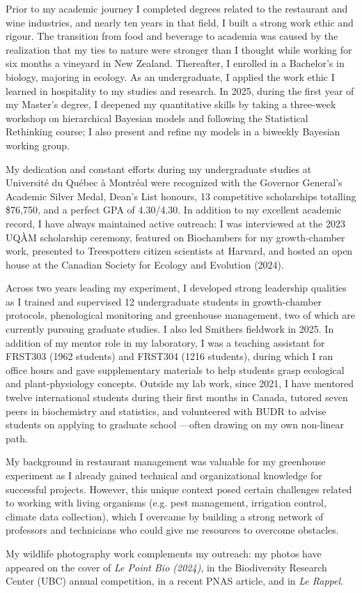 \documentclass[12pt]{article}
\begin{document}
Prior to my academic journey I completed degrees related to the restaurant and wine industries, and nearly ten years in that field, I built a strong work ethic and rigour. The transition from food and beverage to academia was caused by the realization that my ties to nature were stronger than I thought while working for six months a vineyard in New Zealand. Thereafter, I enrolled in a Bachelor's in biology, majoring in ecology. As an undergraduate, I applied the work ethic I learned in hospitality to my studies and research. In 2025, during the first year of my Master's degree, I deepened my quantitative skills by taking a three-week workshop on hierarchical Bayesian models and following the Statistical Rethinking course; I also present and refine my models in a biweekly Bayesian working group.

My dedication and constant efforts during my undergraduate studies at Université du Québec à Montréal were recognized with the Governor General's Academic Silver Medal, Dean's List honours, 13 competitive scholarships totalling \$76,750, and a perfect GPA of 4.30/4.30. In addition to my excellent academic record, I have always maintained active outreach: I was interviewed at the 2023 UQÀM scholarship ceremony, featured on Biochambers for my growth-chamber work, presented to Treespotters citizen scientists at Harvard, and hosted an open house at the Canadian Society for Ecology and Evolution (2024).

Across two years leading my experiment, I developed strong leadership qualities as I trained and supervised 12 undergraduate students in growth-chamber protocols, phenological monitoring and greenhouse management, two of which are currently pursuing graduate studies. I also led Smithers fieldwork in 2025. In addition of my mentor role in my laboratory, I was a teaching assistant for FRST303 (1962 students) and FRST304 (1216 students), during which I ran office hours and gave supplementary materials to help students grasp ecological and plant-physiology concepts. Outside my lab work, since 2021, I have mentored twelve international students during their first months in Canada, tutored seven peers in biochemistry and statistics, and volunteered with BUDR to advise students on applying to graduate school ---often drawing on my own non-linear path.

My background in restaurant management was valuable for my greenhouse experiment as I already gained technical and organizational knowledge for successful projects. However, this unique context posed certain challenges related to working with living organisms (e.g. pest management, irrigation control, climate data collection), which I overcame by building a strong network of professors and technicians who could give me resources to overcome obstacles.


My wildlife photography work complements my outreach: my photos have appeared on the cover of \textit{Le Point Bio (2024)}, in the Biodiversity Research Center (UBC) annual competition, in a recent PNAS article, and in \textit{Le Rappel}.
\end{document}
